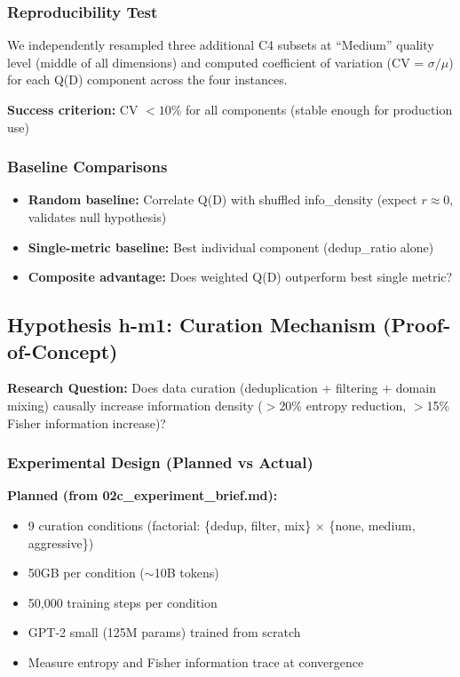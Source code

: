 \subsubsection{Reproducibility Test}

We independently resampled three additional C4 subsets at ``Medium'' quality level (middle of all dimensions) and computed coefficient of variation (CV = $\sigma/\mu$) for each Q(D) component across the four instances.

\textbf{Success criterion:} CV $< 10\%$ for all components (stable enough for production use)

\subsubsection{Baseline Comparisons}

\begin{itemize}
\item \textbf{Random baseline:} Correlate Q(D) with shuffled info\_density (expect $r \approx 0$, validates null hypothesis)
\item \textbf{Single-metric baseline:} Best individual component (dedup\_ratio alone)
\item \textbf{Composite advantage:} Does weighted Q(D) outperform best single metric?
\end{itemize}

\subsection{Hypothesis h-m1: Curation Mechanism (Proof-of-Concept)}

\textbf{Research Question:} Does data curation (deduplication + filtering + domain mixing) causally increase information density ($>$20\% entropy reduction, $>$15\% Fisher information increase)?

\subsubsection{Experimental Design (Planned vs Actual)}

\textbf{Planned (from 02c\_experiment\_brief.md):}
\begin{itemize}
\item 9 curation conditions (factorial: \{dedup, filter, mix\} $\times$ \{none, medium, aggressive\})
\item 50GB per condition ($\sim$10B tokens)
\item 50,000 training steps per condition
\item GPT-2 small (125M params) trained from scratch
\item Measure entropy and Fisher information trace at convergence
\end{itemize}

